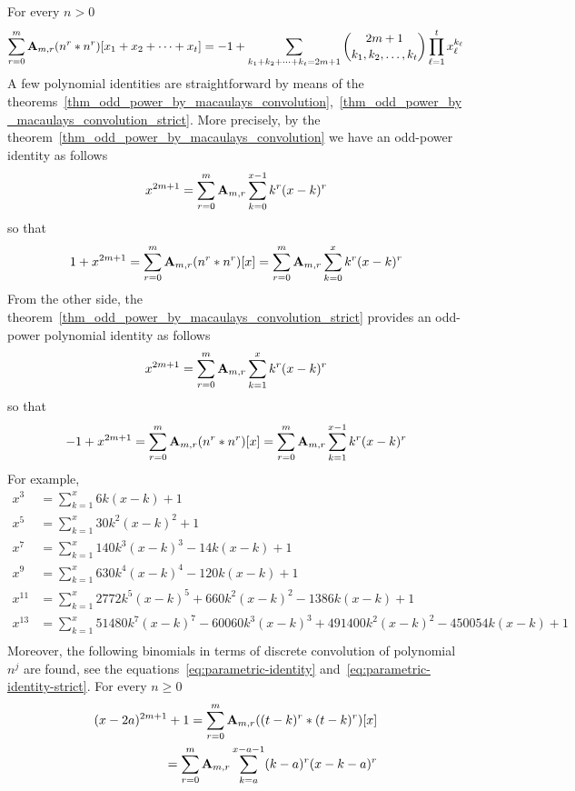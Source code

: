 For every $n>0$
\begin{align*}
    \sum_{r=0}^{m} \coeffA{m}{r} \convPower{n}{r}{\multifoldSum{t}} =
    -1 + \sum_{\multifoldSum[k]{t}=2m+1} \binom{2m+1}{k_1, k_2,\ldots, k_t} \prod_{\ell=1}^{t} x_\ell^{k_\ell}
\end{align*}
A few polynomial identities are straightforward by means of
the theorems~\eqref{thm_odd_power_by_macaulays_convolution},~\eqref{thm_odd_power_by_macaulays_convolution_strict}.
More precisely, by the theorem~\eqref{thm_odd_power_by_macaulays_convolution} we have an odd-power identity as follows
\begin{equation*}
    x^{2m+1} = \sum_{r=0}^{m} \coeffA{m}{r} \sum_{k=0}^{x-1} k^r (x-k)^r
\end{equation*}
so that
\begin{align*}
    1 + x^{2m+1} = \sum_{r=0}^{m} \coeffA{m}{r} \convPower{n}{r}{x}
    = \sum_{r=0}^{m} \coeffA{m}{r} \sum_{k=0}^{x} k^r (x-k)^r
\end{align*}
From the other side, the theorem~\eqref{thm_odd_power_by_macaulays_convolution_strict} provides an odd-power
polynomial identity as follows
\begin{equation*}
    x^{2m+1} = \sum_{r=0}^{m} \coeffA{m}{r} \sum_{k=1}^{x} k^r (x-k)^r
\end{equation*}
so that
\begin{equation*}
    -1 + x^{2m+1} = \sum_{r=0}^{m} \coeffA{m}{r} \convPower{n}{r}{x}
    = \sum_{r=0}^{m} \coeffA{m}{r} \sum_{k=1}^{x-1} k^r (x-k)^r
\end{equation*}
For example,
\begin{align*}
    x^3 &= \sum_{k=1}^{x} 6k (x-k) + 1 \\
    x^5 &= \sum_{k=1}^{x} 30k^2 (x-k)^2 + 1 \\
    x^7 &= \sum_{k=1}^{x} 140 k^3 (x-k)^3 - 14k(x-k) + 1 \\
    x^9 &= \sum_{k=1}^{x} 630 k^4(x-k)^4 - 120k(x-k) + 1 \\
    x^{11} &= \sum_{k=1}^{x} 2772 k^5 (x-k)^5 + 660 k^2(x-k)^2 - 1386k(x-k) + 1 \\
    x^{13} &= \sum_{k=1}^{x} 51480 k^7 (x-k)^7 - 60060 k^3 (x-k)^3 + 491400 k^2 (x-k)^{2} - 450054 k (x-k) + 1 \\
\end{align*}
Moreover, the following binomials in terms of discrete convolution of polynomial $n^j$ are found,
see the equations~\eqref{eq:parametric-identity} and~\eqref{eq:parametric-identity-strict}.
For every $n \geq 0$
\begin{equation*}
    \begin{split}
    (x-2a)
        ^{2m+1} + 1 = \sum_{r=0}^{m} \coeffA{m}{r} ((t-k)^r \ast (t-k)^r)[x] \\
        = \sum_{r=0}^{m} \coeffA{m}{r} \sum_{k=a}^{x-a-1} (k-a)^r (x-k-a)^r
    \end{split}
\end{equation*}
